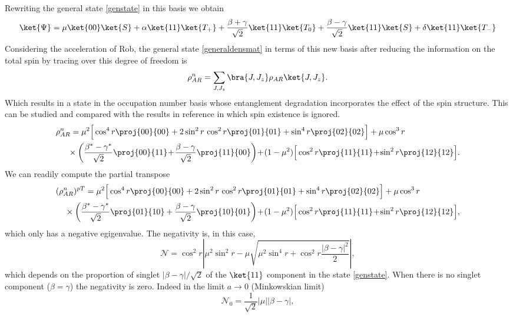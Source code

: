 Rewriting the general state \eqref{genstate} in this basis we obtain
\begin{equation}\label{genstateb2}
\ket{\Psi}=\mu\ket{00}\ket{S}+\alpha\ket{11}\ket{T_+}+\frac{\beta+\gamma}{\sqrt2}\ket{11}\ket{T_0}+ \frac{\beta-\gamma}{\sqrt2}\ket{11}\ket{S}+\delta\ket{11}\ket{T_-}
\end{equation}
Considering the acceleration of Rob, the general state \eqref{generaldensmat} in terms of this new basis after reducing the information on the total spin by tracing over this degree of freedom is
\begin{equation}
\rho^n_{AR}=\sum_{J,J_z}\bra{J,J_z}\rho_{AR}\ket{J,J_z}.
\end{equation}
Which results in a state in the occupation number basis whose entanglement degradation incorporates the effect of the spin structure. This can be studied and compared with the results in reference \cite{AlsingSchul} in which spin existence is ignored.
\begin{align}\label{densityred}
\nonumber\rho^n_{AR}&=\mu^2\Big[\cos^4r\proj{00}{00}+2\sin^2r\,\cos^2r\proj{01}{01}+\sin^4r\proj{02}{02}\Big]+\mu\cos^3r\\*
&\!\!\times\left(\frac{\beta^*-\gamma^*}{\sqrt2}\proj{00}{11}\!+\!\frac{\beta-\gamma}{\sqrt2}\proj{11}{00}\right)\!+\!(1-\mu^2)\Big[\cos^2r\proj{11}{11}\!+\!\sin^2r\proj{12}{12}\Big].
\end{align}
We can readily compute the partial transpose 
\begin{align}\label{densityred}
\nonumber(\rho^n_{AR})^{pT}&=\mu^2\Big[\cos^4r\proj{00}{00}+2\sin^2r\,\cos^2r\proj{01}{01}+\sin^4r\proj{02}{02}\Big]+\mu\cos^3r\\*
&\!\!\!\!\!\!\!\!\!\!\!\!\!\!\!\times\left(\frac{\beta^*-\gamma^*}{\sqrt2}\proj{01}{10}+\frac{\beta-\gamma}{\sqrt2}\proj{10}{01}\right)\!+\!(1-\mu^2)\Big[\cos^2r\proj{11}{11}\!+\!\sin^2r\proj{12}{12}\Big],
\end{align}
which only has a negative egigenvalue. The negativity is, in this case,
\begin{equation}\label{negativitymode}
\mathcal{N}=\cos^2r\left|\mu^2\sin^2r-\mu\sqrt{\mu^2\sin^4r+\cos^2r\frac{|\beta-\gamma|^2}{2}}\right|,
\end{equation}
which depends on the proportion of singlet \mbox{$|\beta-\gamma|/\sqrt2$} of the $\ket{11}$ component in the state \eqref{genstate}. When there is no singlet component ($\beta=\gamma$) the negativity is zero. Indeed in the limit $a\rightarrow0$ (Minkowskian limit)
\begin{equation}\label{negativitymode0}
\mathcal{N}_0=\frac{1}{\sqrt2}\left|\mu\right|\left|\beta-\gamma\right|,
\end{equation}
